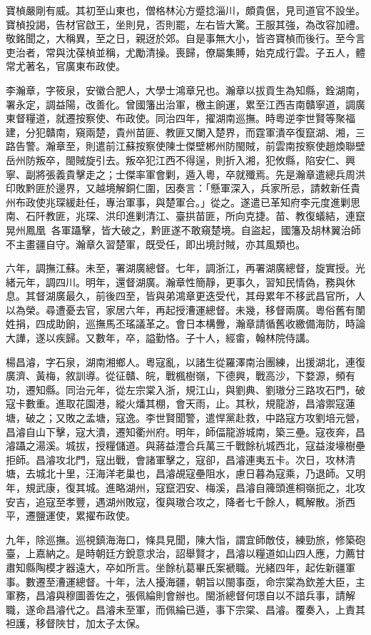 \begin{pinyinscope}
寶楨嚴剛有威。其初至山東也，僧格林沁方蹙捻淄川，頗貴倨，見司道官不設坐。寶楨投謁，告材官啟王，坐則見，否則罷，左右皆大驚。王服其強，為改容加禮。敬銘聞之，大稱異，至之日，親迓於郊。自是事無大小，皆咨寶楨而後行。至今言吏治者，常與沈葆楨並稱，尤勵清操。喪歸，僚屬集賻，始克成行雲。子五人，體常尤著名，官廣東布政使。

李瀚章，字筱泉，安徽合肥人，大學士鴻章兄也。瀚章以拔貢生為知縣，銓湖南，署永定，調益陽，改善化。曾國籓出治軍，檄主餉運，累至江西吉南贛寧道，調廣東督糧道，就遷按察使、布政使。同治四年，擢湖南巡撫。時粵逆李世賢等聚福建，分犯贛南，窺兩楚，貴州苗匪、教匪又闌入楚界，而霆軍潰卒復竄湖、湘，三路告警。瀚章至，則遣前江蘇按察使陳士傑壁郴州防閩賊，前雲南按察使趙煥聯壁岳州防叛卒，閩賊旋引去。叛卒犯江西不得逞，則折入湘，犯攸縣，陷安仁、興寧、副將張義貴擊走之；士傑率軍會剿，遁入粵，卒就殲焉。先是瀚章遣總兵周洪印敗黔匪於邊界，又越境解銅仁圍，因奏言：「懸軍深入，兵家所忌，請敕新任貴州布政使兆琛緩赴任，專治軍事，與楚軍合。」從之。遂遣已革知府李元度進剿思南、石阡教匪，兆琛、洪印進剿清江、臺拱苗匪，所向克捷。苗、教復蟻結，連竄晃州鳳凰，各軍躡擊，皆大破之，黔匪遂不敢窺楚境。自盜起，國籓及胡林翼治師不主畫疆自守。瀚章久習楚軍，既受任，即出境討賊，亦其風類也。

六年，調撫江蘇。未至，署湖廣總督。七年，調浙江，再署湖廣總督，旋實授。光緒元年，調四川。明年，還督湖廣。瀚章性簡靜，更事久，習知民情偽，務與休息。其督湖廣最久，前後四至，皆與弟鴻章更迭受代，其母累年不移武昌官所，人以為榮。尋遭憂去官，家居六年，再起授漕運總督。未幾，移督兩廣。粵俗舊有闈姓捐，四成助餉，巡撫馬丕瑤議革之。會日本構釁，瀚章請循舊收繳備海防，時論大譁，遂以疾歸。又數年，卒，謚勤恪。子十人，經畬，翰林院侍講。

楊昌濬，字石泉，湖南湘鄉人。粵寇亂，以諸生從羅澤南治團練，出援湖北，連復廣濟、黃梅，敘訓導。從征贛、皖，戰楓樹嶺，下德興，戰高沙，下婺源，頻有功，遷知縣。同治元年，從左宗棠入浙，規江山，與劉典、劉璈分三路攻石門，破寇卡數重。進取花園港，縱火燔其棚，會天雨，止。其秋，規龍游，昌濬禦寇蓮塘，破之；又敗之孟塘，寇逸。李世賢聞警，遣悍黨赴救，中路寇方攻劉培元營，昌濬自山下擊，寇大潰，遷知衢州府。明年，師偪龍游城南，築三壘。寇夜奔，昌濬躡之湯溪。城拔，授糧儲道。與蔣益澧合兵萬三千戰餘杭城西北，寇益浚壕樹壘拒師。昌濬攻北門，寇出戰，會諸軍擊之，寇卻，昌濬連夷五卡。次日，攻林清塘，去城北十里，汪海洋老巢也，昌濬覘寇壘阻水，慮日暮為寇乘，乃退師。又明年，規武康，復其城。進略湖州，寇竄泗安、梅溪，昌濬自簰頭進桐嶺扼之，北攻安吉，追寇至孝豐，遇湖州敗寇，復與璈合攻之，降者七千餘人，輒解散。浙西平，遷鹽運使，累擢布政使。

九年，除巡撫。巡視鎮海海口，條具見聞，陳大恉，謂宜師敵伎，練勁旅，修築砲臺，上嘉納之。是時朝廷方銳意求治，詔舉賢才，昌濬以糧道如山四人應，力薦甘肅知縣陶模才器遠大，卒如所言。坐餘杭葛畢氏案褫職。光緒四年，起佐新疆軍事。數遷至漕運總督。十年，法人擾海疆，朝旨以閩事亟，命宗棠為欽差大臣，主軍務，昌濬與穆圖善佐之，張佩綸則會辦也。閩浙總督何璟自以不諳兵事，請解職，遂命昌濬代之。昌濬未至軍，而佩綸已遁，事下宗棠、昌濬。覆奏入，上責其袒護，移督陜甘，加太子太保。


\end{pinyinscope}
